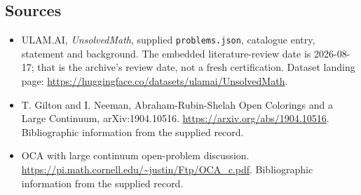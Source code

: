 \documentclass[11pt,a4paper]{article}
\begin{document}
\subsection{Sources}

{\small

\begin{itemize}

\item[\hypertarget{source:statement:1}{S1}] ULAM.AI, \emph{UnsolvedMath}, supplied \texttt{problems.json}, catalogue entry, statement and background. The embedded literature-review date is 2026-08-17; that is the archive’s review date, not a fresh certification. Dataset landing page: \url{https://huggingface.co/datasets/ulamai/UnsolvedMath}.

\item[\hypertarget{source:statement:2}{S2}] T. Gilton and I. Neeman, Abraham-Rubin-Shelah Open Colorings and a Large Continuum, arXiv:1904.10516. \url{https://arxiv.org/abs/1904.10516}. Bibliographic information from the supplied record.

\item[\hypertarget{source:statement:3}{S3}] OCA with large continuum open-problem discussion. \url{https://pi.math.cornell.edu/~justin/Ftp/OCA_c.pdf}. Bibliographic information from the supplied record.

\end{itemize}

}

\label{end:statement}
\end{document}

